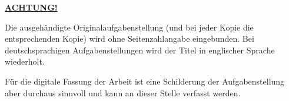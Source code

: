 \textbf{\underline{ACHTUNG!}}
\par
Die ausgehändigte Originalaufgabenstellung (und bei jeder Kopie
die entsprechenden Kopie) wird ohne Seitenzahlangabe
eingebunden. Bei deutschsprachigen Aufgabenstellungen wird
der Titel in englischer Sprache wiederholt.
\par
Für die digitale Fassung der Arbeit ist eine Schilderung der Aufgabenstellung aber durchaus sinnvoll und kann an dieser Stelle verfasst werden.
